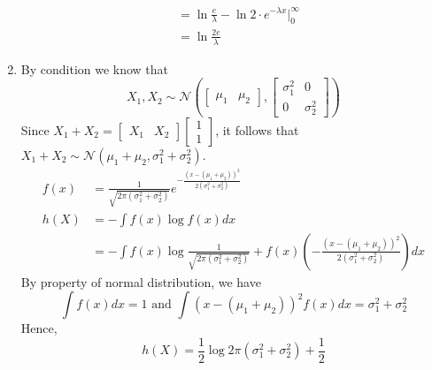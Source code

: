 \begin{exercise}
\begin{solution}
\begin{enumerate}
\begin{equation}
\begin{aligned}
        &= \ln \frac{e}{\lambda} - \ln 2 \cdot e^{-\lambda x} \bigg| ^{\infty}_{0} \\
        &= \ln \frac{2e}{\lambda}
      \end{aligned}
    \end{equation}
    \item By condition we know that
    \begin{equation}
      X_1, X_2 \sim \mathcal{N}\left(
        \left[\begin{array}{cc}
          \mu_1 & \mu_2 
        \end{array}\right], 
        \left[\begin{array}{cc}
          \sigma_1^{2} & 0 \\
           0 & \sigma_2^{2}
        \end{array}\right]\right)
    \end{equation}
    Since $X_1 + X_2 = \left[\begin{array}
      {cc} X_1 & X_2
    \end{array}\right] \left[\begin{array}
      {c} 1 \\ 1
    \end{array}\right]$, it follows that $X_1 + X_2 \sim \mathcal{N} (\mu_1 + \mu_2, \sigma_{1}^{2} + \sigma_{2}^{2})$.
    \begin{equation}
      \begin{aligned}
        f(x) &= \frac{1}{\sqrt{2 \pi (\sigma_{1}^{2} + \sigma_{2}^{2})}} e^{-\frac{(x-(\mu_1 + \mu_2))^{2}}{2 (\sigma_{1}^{2} + \sigma_{2}^{2})}} \\        
        h(X)&=-\int f(x) \log f(x) d x \\
        &=-\int f(x) \log \frac{1}{\sqrt{2 \pi (\sigma_{1}^{2} + \sigma_{2}^{2})}}+f(x)\left(-\frac{(x-(\mu_1 + \mu_2))^{2}}{2 (\sigma_{1}^{2} + \sigma_{2}^{2})}\right) d x         
        \end{aligned}      
    \end{equation}
    By property of normal distribution, we have
    \begin{equation}
      \int f(x) d x=1 \text { and } \int(x-(\mu_1 + \mu_2))^{2} f(x) d x=\sigma_{1}^{2} + \sigma_{2}^{2}
    \end{equation}
    Hence, 
    \begin{equation}
      h(X) = \frac{1}{2} \log 2\pi (\sigma_{1}^{2}+\sigma_{2}^{2}) + \frac{1}{2}
    \end{equation}
  \end{enumerate}
  \end{solution}
  \label{ex1}
\end{exercise}

